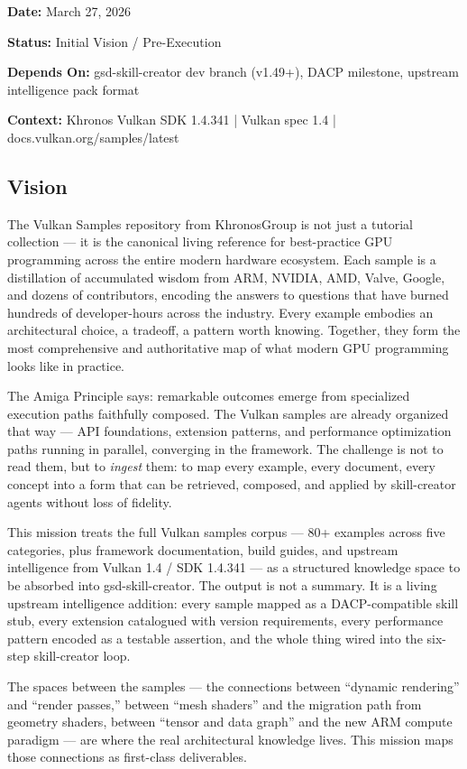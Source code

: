 \documentclass[11pt,letterpaper]{article}
\newcommand{\metafield}[2]{\textbf{\sffamily #1} #2\par}
\begin{document}
\metafield{Date:}{March 27, 2026}
\metafield{Status:}{Initial Vision / Pre-Execution}
\metafield{Depends On:}{gsd-skill-creator dev branch (v1.49+), DACP milestone, upstream intelligence pack format}
\metafield{Context:}{Khronos Vulkan SDK 1.4.341 | Vulkan spec 1.4 | docs.vulkan.org/samples/latest}

\subsection{Vision}

The Vulkan Samples repository from KhronosGroup is not just a tutorial collection --- it is the canonical living reference for best-practice GPU programming across the entire modern hardware ecosystem. Each sample is a distillation of accumulated wisdom from ARM, NVIDIA, AMD, Valve, Google, and dozens of contributors, encoding the answers to questions that have burned hundreds of developer-hours across the industry. Every example embodies an architectural choice, a tradeoff, a pattern worth knowing. Together, they form the most comprehensive and authoritative map of what modern GPU programming looks like in practice.

The Amiga Principle says: remarkable outcomes emerge from specialized execution paths faithfully composed. The Vulkan samples are already organized that way --- API foundations, extension patterns, and performance optimization paths running in parallel, converging in the framework. The challenge is not to read them, but to \emph{ingest} them: to map every example, every document, every concept into a form that can be retrieved, composed, and applied by skill-creator agents without loss of fidelity.

This mission treats the full Vulkan samples corpus --- 80+ examples across five categories, plus framework documentation, build guides, and upstream intelligence from Vulkan 1.4 / SDK 1.4.341 --- as a structured knowledge space to be absorbed into gsd-skill-creator. The output is not a summary. It is a living upstream intelligence addition: every sample mapped as a DACP-compatible skill stub, every extension catalogued with version requirements, every performance pattern encoded as a testable assertion, and the whole thing wired into the six-step skill-creator loop.

The spaces between the samples --- the connections between ``dynamic rendering'' and ``render passes,'' between ``mesh shaders'' and the migration path from geometry shaders, between ``tensor and data graph'' and the new ARM compute paradigm --- are where the real architectural knowledge lives. This mission maps those connections as first-class deliverables.
\end{document}
